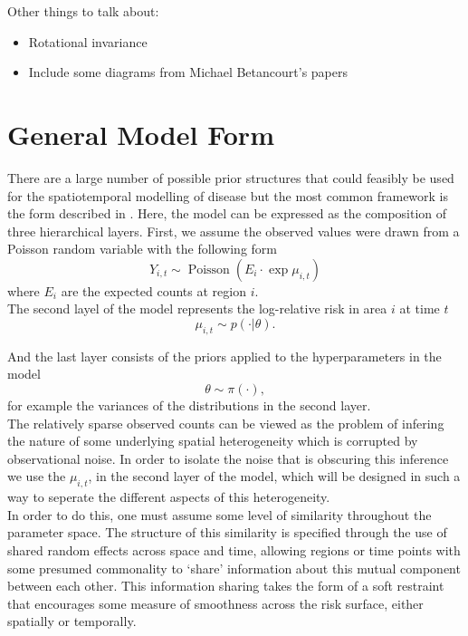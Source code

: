 \documentclass[11pt]{report}
\begin{document}
Other things to talk about:
\begin{itemize}

\item Rotational invariance

\item Include some diagrams from Michael Betancourt's papers

\end{itemize}

\section{General Model Form}

There are a large number of possible prior structures that could feasibly be used for the spatiotemporal modelling of disease but the most common framework is the form described in \citet{best2005comparison}. Here, the model can be expressed as the composition of three hierarchical layers. First, we assume the observed values were drawn from a Poisson random variable with the following form
\begin{equation}
Y_{i,t} \sim \operatorname{Poisson}(E_i\cdot \exp{\mu_{i,t}})
\end{equation}
where $E_i$ are the expected counts at region $i$. \\

The second layel of the model represents the log-relative risk in area $i$ at time $t$
\begin{equation}
\mu_{i,t} \sim p(\cdot | \theta).
\end{equation}

And the last layer consists of the priors applied to the hyperparameters in the model
\begin{equation}
\theta \sim \pi(\cdot),
\end{equation}
for example the variances of the distributions in the second layer. \\

The relatively sparse observed counts can be viewed as the problem of infering the nature of some underlying spatial heterogeneity which is corrupted by observational noise. In order to isolate the noise that is obscuring this inference we use the $\mu_{i,t}$, in the second layer of the model, which will be designed in such a way to seperate the different aspects of this heterogeneity. \\

In order to do this, one must assume some level of similarity throughout the parameter space. The structure of this similarity is specified through the use of shared random effects across space and time, allowing regions or time points with some presumed commonality to `share' information about this mutual component between each other. This information sharing takes the form of a soft restraint that encourages some measure of smoothness across the risk surface, either spatially or temporally. \\
\end{document}
